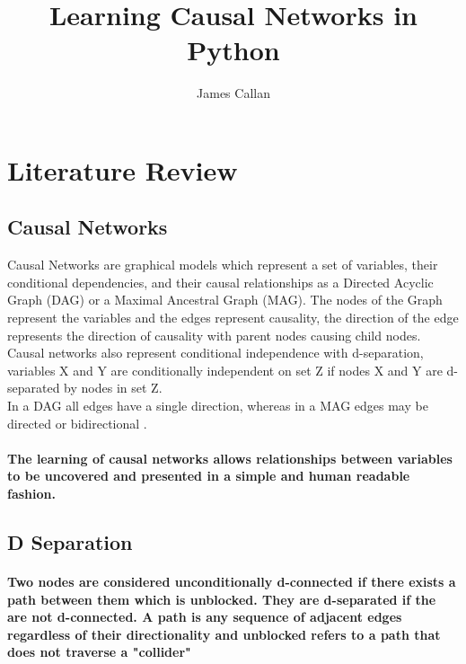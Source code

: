 \documentclass{article}
\begin{document}
\title{Learning Causal Networks in Python}
\author{James Callan}
\date{}

\maketitle

\newpage

\section{Literature Review}

\subsection{Causal Networks}

Causal Networks are graphical models which represent a set of variables, their conditional dependencies, and their causal relationships\cite{verma1990causal} as a Directed Acyclic Graph (DAG) or a Maximal Ancestral Graph (MAG). The nodes of the Graph represent the variables and the edges represent causality, the direction of the edge represents the direction of causality with parent nodes causing child nodes\cite{verma1990causal}. Causal networks also represent conditional independence with d-separation, variables X and Y are conditionally independent on set Z if nodes X and Y are d-separated by nodes in set Z\cite{verma1990causal}.
\\
In a DAG all edges have a single direction, whereas in a MAG edges may be directed or bidirectional \cite{zhang2008causal}.

\paragraph{The learning of causal networks allows relationships between variables to be uncovered and presented in a simple and human readable fashion.}
\subsection{D Separation}
\paragraph{Two nodes are considered unconditionally  d-connected if there exists a path between them which is unblocked. They are d-separated if the are not d-connected. A path is any sequence of adjacent edges regardless of their directionality and unblocked refers to a path that does not traverse a "collider"\cite{pearl2003causality}}
\end{document}
